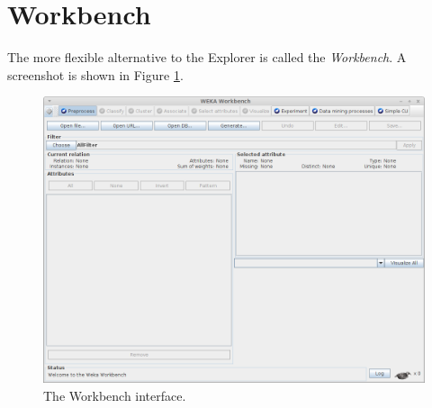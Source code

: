 \clearpage
\section{Workbench}
The more flexible alternative to the Explorer is called the \textit{Workbench}.
A screenshot is shown in Figure \ref{workbench}.

\begin{figure}[htb]
  \centering
  \includegraphics[width=12.0cm]{images/workbench.png}
  \caption{The Workbench interface.}
  \label{workbench}
\end{figure}
